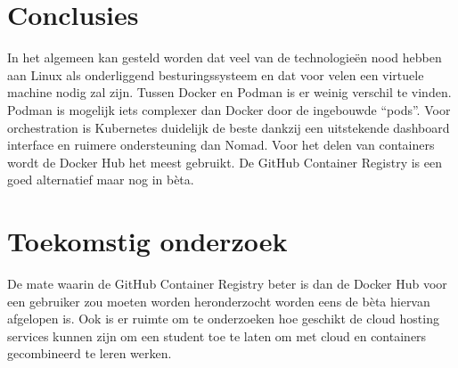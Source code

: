 \documentclass[a0,portrait]{a0poster}
\begin{document}
\begin{multicols}{2}
\color{HoGentAccent1} 
\section*{Conclusies}
\color{black}
In het algemeen kan gesteld worden dat veel van de technologieën nood hebben aan Linux als onderliggend besturingssysteem en dat voor velen een virtuele machine nodig zal zijn. Tussen Docker en Podman is er weinig verschil te vinden. Podman is mogelijk iets complexer dan Docker door de ingebouwde “pods”. Voor orchestration is Kubernetes duidelijk de beste dankzij een uitstekende dashboard interface en ruimere ondersteuning dan Nomad. Voor het delen van containers wordt de Docker Hub het meest gebruikt. De GitHub Container Registry is een goed alternatief maar nog in bèta.
\color{HoGentAccent1} 
\section*{Toekomstig onderzoek}
\color{black}

De mate waarin de GitHub Container Registry beter is dan de Docker Hub voor een gebruiker zou moeten worden heronderzocht worden eens de bèta hiervan afgelopen is. Ook is er ruimte om te onderzoeken hoe geschikt de cloud hosting services kunnen zijn om een student toe te laten om met cloud en containers gecombineerd te leren werken.



\end{multicols}
\end{document}
